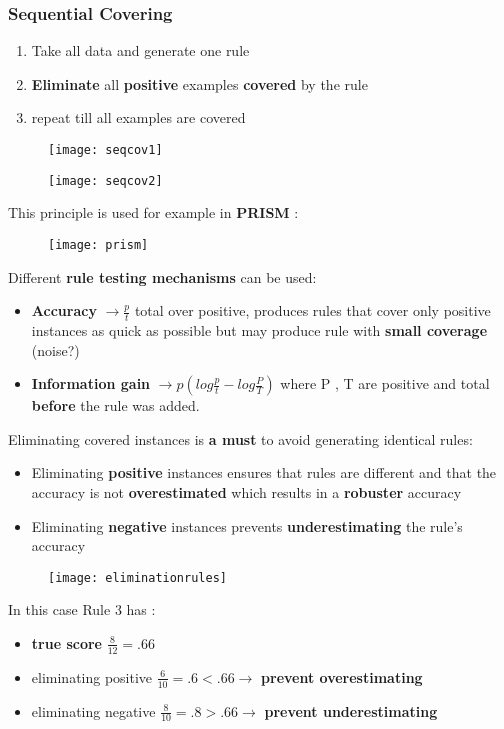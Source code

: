 \subsubsection{Sequential Covering}
\begin{enumerate}
\item Take all data and generate one rule
\item \textbf{Eliminate} all \textbf{positive} examples \textbf{covered} by the rule
\item repeat till all examples are covered
\end{enumerate}
\begin{figure}[H]
  \centering
  \texttt{[image: seqcov1]}
\end{figure}
\begin{figure}[H]
  \centering
  \texttt{[image: seqcov2]}
\end{figure}
This principle is used for example in \textbf{PRISM} :
\begin{figure}[H]
  \centering
  \texttt{[image: prism]}
\end{figure}
Different \textbf{rule testing mechanisms} can be used:
\begin{itemize}
\item \textbf{Accuracy} $\rightarrow \frac{p}{t}$ total over positive, produces rules that cover only positive instances as quick as possible but may produce rule with \textbf{small coverage} (noise?)
\item \textbf{Information gain} $\rightarrow p(log \frac{p}{t}- log \frac{P}{T})$
where P , T are positive and total \textbf{before} the rule was added. 
\end{itemize}
Eliminating covered instances is \textbf{a must} to avoid generating identical rules:
\begin{itemize}
\item Eliminating \textbf{positive} instances ensures that rules are different and that the accuracy is not \textbf{overestimated} which results in a \textbf{robuster} accuracy
\item Eliminating \textbf{negative} instances prevents \textbf{underestimating} the rule's accuracy 
\end{itemize}
\begin{figure}[H]
  \centering
  \texttt{[image: eliminationrules]}
\end{figure}
In this case Rule 3 has :
\begin{itemize}
\item \textbf{true score} $\frac{8}{12} = .66$
\item eliminating positive $\frac{6}{10} = .6 < .66 \rightarrow$ \textbf{prevent overestimating}
\item eliminating negative $\frac{8}{10} = .8 > .66 \rightarrow$ \textbf{prevent underestimating}
\end{itemize}


